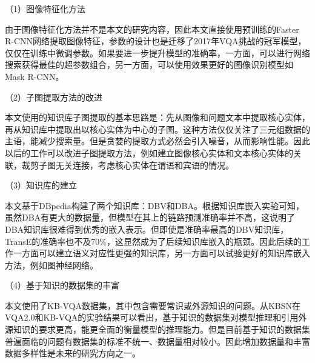 （1）图像特征化方法

由于图像特征化方法并不是本文的研究内容，因此本文直接使用预训练的Faster R-CNN网络提取图像特征，参数的设计也是迁移了2017年VQA挑战的冠军模型，仅仅在训练中微调参数。如果要进一步提升模型的准确率，一方面，可以进行网络搜索获得最佳的超参数组合，另一方面，可以使用效果更好的图像识别模型如Mask R-CNN。

（2）子图提取方法的改进

本文使用的知识库子图提取的基本思路是：先从图像和问题文本中提取核心实体，再从知识库中提取出以核心实体为中心的子图。这种方法仅仅关注了三元组数据的主语，能减少搜索量。但是贪婪的提取方式必然会引入噪音，从而影响性能。因此以后的工作可以改进子图提取方法，例如建立图像核心实体和文本核心实体的关联，裁剪子图无关连接，考虑核心实体在谓语和宾语的情况。

（3）知识库的建立

本文基于DBpedia构建了两个知识库：DBV和DBA。根据知识库嵌入实验可知，虽然DBA有更大的数据量，但模型在其上的链路预测准确率并不高，这说明了DBA知识库很难得到优秀的嵌入表示。但即使是准确率最高的DBV知识库，TransE的准确率也不及70\%，这显然成为了后续知识库嵌入的瓶颈。因此后续的工作一方面可以建立语义对应性更强的知识库，另一方面可以试验更好的知识库嵌入方法，例如图神经网络。

（4）基于知识的数据集的丰富

本文使用了KB-VQA数据集，其中包含需要常识或外源知识的问题。从KBSN在VQA2.0和KB-VQA的实验结果可以看出，基于知识的数据集对模型推理和引用外源知识的要求更高，能更全面的衡量模型的推理能力。但是目前基于知识的数据集普遍面临的问题有数据集的标准不统一、数据量相对较小。因此增加数据量和丰富数据多样性是未来的研究方向之一。

